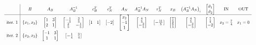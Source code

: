 \begin{equation*}
\scalemath{0.75}{
\begin{array}{ c|c c c c c c c c c c c c c }
 & B & A_{B} & A_{B}^{-1} & c_{B}^{T} & c_{N}^{T} & A_{N} & A_{B}^{-1} A_{N} & r_{N}^{T} & x_{B} & \left( A_{B}^{-1} A_{N}\right)_{i} & \begin{bmatrix}
\vartheta _{1}\\
\vartheta _{2}
\end{bmatrix} & \text{IN} & \text{OUT}\\
\hline
\text{iter.} \ 1 & \{x_{1} ,x_{3}\} & \begin{bmatrix}
1 & 3\\
2 & 1
\end{bmatrix} & \begin{bmatrix}
-\frac{1}{5} & \frac{3}{5}\\
\frac{2}{5} & -\frac{1}{5}
\end{bmatrix} & \begin{bmatrix}
1 & 1
\end{bmatrix} & \begin{bmatrix}
-2
\end{bmatrix} & \begin{bmatrix}
x_{2}\\
-1\\
1
\end{bmatrix} & \begin{bmatrix}
\frac{4}{5}\\
-\frac{3}{5}
\end{bmatrix} & \begin{bmatrix}
-\frac{11}{5}
\end{bmatrix} & \begin{bmatrix}
\frac{7}{5}\\
\frac{6}{5}
\end{bmatrix} & \begin{bmatrix}
\frac{4}{5}\\
-\frac{3}{5}
\end{bmatrix} & \begin{bmatrix}
\frac{7}{4}\\
-2
\end{bmatrix} & x_{2} =\frac{7}{4} & x_{1} =0\\
\text{iter.} \ 2 & \{x_{2} ,x_{3}\} & \begin{bmatrix}
-1 & 3\\
1 & 1
\end{bmatrix} & \begin{bmatrix}
-\frac{1}{4} & \frac{3}{4}\\

\end{bmatrix}
\end{array}}
\end{equation*}

